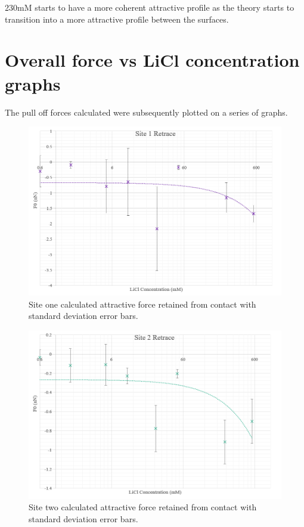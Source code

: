
230mM starts to have a more coherent attractive profile as the theory starts to transition into a more attractive profile between the surfaces.


\section{Overall force vs LiCl concentration graphs}

The pull off forces calculated were subsequently plotted on a series of graphs.

\begin{figure}
    \centering
    \includegraphics[width=1\linewidth]{chapter6/Overall/Site 1.png}
    \caption{Site one calculated attractive force retained from contact with standard deviation error bars.}
    \label{fig:site1cont}
\end{figure}

\begin{figure}
    \centering
    \includegraphics[width=1\linewidth]{chapter6/Overall/Site 2.png}
    \caption{Site two calculated attractive force retained from contact with standard deviation error bars.}
    \label{fig:site2cont}
\end{figure}

